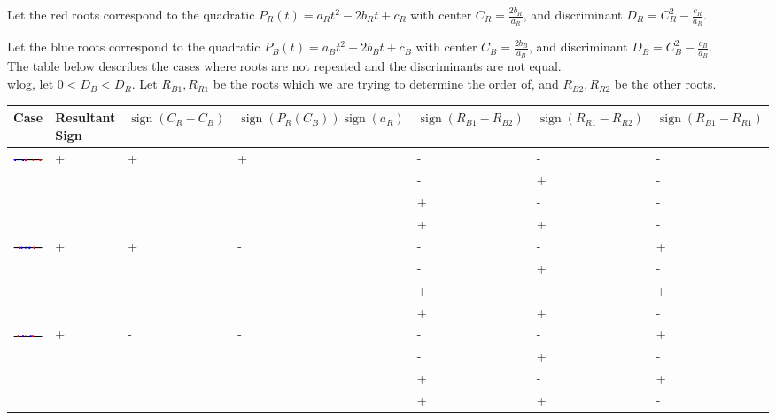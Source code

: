 \documentclass{article}
\DeclareMathOperator{\sign}{sign}
\begin{document}
\noindent
Let the red roots correspond to the quadratic
$P_R(t)=a_Rt^2-2b_Rt+c_R$ with center $C_R=\frac{2 b_R}{a_R}$,
and discriminant $D_R=C_R^2-\frac{c_R}{a_R}$.

\noindent
Let the blue roots correspond to the quadratic
$P_B(t)=a_Bt^2-2b_Bt+c_B$ with center $C_B=\frac{2 b_B}{a_B}$,
and discriminant $D_B=C_B^2-\frac{c_B}{a_B}$.\\

\noindent
The table below describes the cases where roots are not repeated and
the discriminants are not equal.\\
wlog, let $0 < D_B < D_R$.
Let $R_{B1}, R_{R1}$ be the roots which we are trying to determine the order of,
and $R_{B2}, R_{R2}$ be the other roots.

\flushleft
\begin{tabular}{|l|lll|ll|l|}
  \hline Case & Resultant Sign & $\sign(C_R-C_B)$ &
  $\sign(P_R(C_B))\sign(a_R)$ & $\sign(R_{B1}-R_{B2})$ &
  $\sign(R_{R1}-R_{R2})$ & $\sign(R_{B1}-R_{R1})$\\ \hline
  
  \multirow{4}{*}{\includegraphics[width=100pt]{imgs/root_orderings_case1.png}}
  & \multirow{4}{*}{+} & \multirow{4}{*}{+} & \multirow{4}{*}{+}
     & - & - & - \\
  &&&& - & + & - \\
  &&&& + & - & - \\
  &&&& + & + & - \\ \hline

  \multirow{4}{*}{\includegraphics[width=100pt]{imgs/root_orderings_case4.png}}
  & \multirow{4}{*}{+} & \multirow{4}{*}{+} & \multirow{4}{*}{-}
     & - & - & + \\
  &&&& - & + & - \\
  &&&& + & - & + \\
  &&&& + & + & - \\ \hline
  
  \multirow{4}{*}{\includegraphics[width=100pt]{imgs/root_orderings_case5.png}}
  & \multirow{4}{*}{+} & \multirow{4}{*}{-} & \multirow{4}{*}{-}
     & - & - & + \\
  &&&& - & + & - \\
  &&&& + & - & + \\
  &&&& + & + & - \\ \hline
  

\end{tabular}
\end{document}
